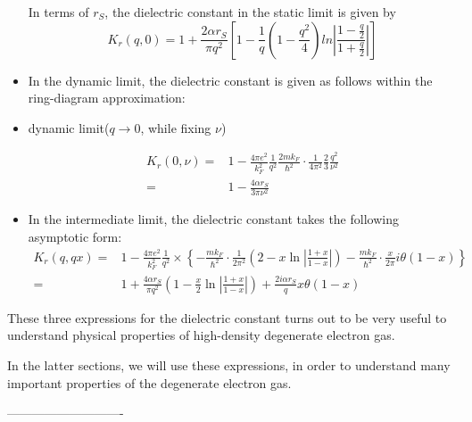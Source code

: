\begin{itemize}
In terms of $r_S$, the dielectric constant in the static limit is given by
\begin{equation} \label{Eqs2.8.33}
K_r(q,0) = 1+ \frac{2\alpha r_S}{\pi q^2}\left[ 1-\frac{1}{q}(1-\frac{q^2}{4})ln\left| \frac{1-\frac{q}{2}}{1+\frac{q}{2}} \right| \right]
\end{equation}

\item In the dynamic limit, the dielectric constant is given as follows within the ring-diagram approximation:
\item \begin{center}dynamic limit($q \rightarrow 0$, while fixing $\nu$)\end{center}
\begin{equation} \label{Eqs2.8.34} \begin{split}
K_r(0,\nu) =& 1- \frac{4\pi e^2}{k_F^2} \frac{1}{q^2}\frac{2 m k_F}{\hbar^2} \cdot \frac{1}{4\pi^2} \frac{2}{3}\frac{q^2}{\nu^2}\\
=& 1- \frac{4\alpha r_S}{3\pi \nu^2}
\end{split}\end{equation}

\item In the intermediate limit, the dielectric constant takes the following  asymptotic form:
\begin{equation} \label{Eqs2.8.35} \begin{split}
K_r(q,qx) =& 1-\frac{4\pi e^2}{k_F^2}\frac{1}{q^2} \times \left\{ - \frac{m k_F}{\hbar^2}\cdot\frac{1}{2\pi^2}\left( 2-x \ln\left| \frac{1+x}{1-x} \right| \right) - \frac{m k_F}{\hbar^2}\cdot \frac{x}{2\pi} i \theta(1-x) \right\}\\
=& 1+ \frac{4 \alpha r_S}{\pi q^2}\left( 1-\frac{x}{2} \ln\left| \frac{1+x}{1-x} \right|  \right) + \frac{2 i \alpha r_S}{q} x \theta(1-x)
\end{split}\end{equation}

\end{itemize}

These three expressions for the dielectric constant turns out to be very useful to understand physical properties of high-density degenerate electron gas.

In the latter sections, we will use these expressions, in order to understand many important properties of the degenerate electron gas.
\begin{center}----------------------------\end{center}

